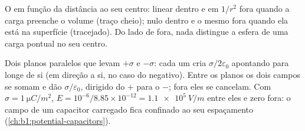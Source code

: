 \begin{omfigure}

{\small O  em função da distância ao seu centro:
linear dentro e em $1/r^2$ fora quando a carga preenche o volume
(traço cheio); nulo dentro e o mesmo fora quando ela está na superfície
(tracejado). Do lado de fora, nada distingue a esfera de uma carga pontual
no seu centro.}
\end{omfigure}

\begin{example}\label{ex:b1:electrostatics-gauss:twoplanes}
Dois planos paralelos que levam $+\sigma$ e $-\sigma$: cada um cria
$\sigma/2\varepsilon_0$ apontando para longe de si (em direção a si, no caso do negativo).
Entre os planos os dois campos se somam e dão $\sigma/\varepsilon_0$, dirigido do
$+$ para o $-$; fora eles se cancelam. Com $\sigma = \qty{1}{\micro C/m^2}$, $E =
10^{-6}/8.85 \times 10^{-12} = \qty{1.1e5}{V/m}$ entre eles e zero fora: o
campo de um capacitor carregado fica confinado ao seu espaçamento
(\cref{ch:b1:potential-capacitors}).
\end{example}

